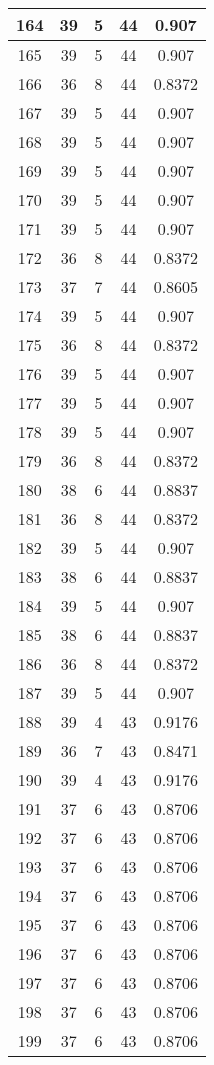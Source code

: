 \documentclass[letterpaper, 12pt]{article}
\begin{document}
\begin{longtable}{|c|c|c|c|c|}
164 & 39 & 5 & 44 & 0.907 \\
\hline
165 & 39 & 5 & 44 & 0.907 \\
\hline
166 & 36 & 8 & 44 & 0.8372 \\
\hline
167 & 39 & 5 & 44 & 0.907 \\
\hline
168 & 39 & 5 & 44 & 0.907 \\
\hline
169 & 39 & 5 & 44 & 0.907 \\
\hline
170 & 39 & 5 & 44 & 0.907 \\
\hline
171 & 39 & 5 & 44 & 0.907 \\
\hline
172 & 36 & 8 & 44 & 0.8372 \\
\hline
173 & 37 & 7 & 44 & 0.8605 \\
\hline
174 & 39 & 5 & 44 & 0.907 \\
\hline
175 & 36 & 8 & 44 & 0.8372 \\
\hline
176 & 39 & 5 & 44 & 0.907 \\
\hline
177 & 39 & 5 & 44 & 0.907 \\
\hline
178 & 39 & 5 & 44 & 0.907 \\
\hline
179 & 36 & 8 & 44 & 0.8372 \\
\hline
180 & 38 & 6 & 44 & 0.8837 \\
\hline
181 & 36 & 8 & 44 & 0.8372 \\
\hline
182 & 39 & 5 & 44 & 0.907 \\
\hline
183 & 38 & 6 & 44 & 0.8837 \\
\hline
184 & 39 & 5 & 44 & 0.907 \\
\hline
185 & 38 & 6 & 44 & 0.8837 \\
\hline
186 & 36 & 8 & 44 & 0.8372 \\
\hline
187 & 39 & 5 & 44 & 0.907 \\
\hline
188 & 39 & 4 & 43 & 0.9176 \\
\hline
189 & 36 & 7 & 43 & 0.8471 \\
\hline
190 & 39 & 4 & 43 & 0.9176 \\
\hline
191 & 37 & 6 & 43 & 0.8706 \\
\hline
192 & 37 & 6 & 43 & 0.8706 \\
\hline
193 & 37 & 6 & 43 & 0.8706 \\
\hline
194 & 37 & 6 & 43 & 0.8706 \\
\hline
195 & 37 & 6 & 43 & 0.8706 \\
\hline
196 & 37 & 6 & 43 & 0.8706 \\
\hline
197 & 37 & 6 & 43 & 0.8706 \\
\hline
198 & 37 & 6 & 43 & 0.8706 \\
\hline
199 & 37 & 6 & 43 & 0.8706 \\
\hline
\end{longtable}
\end{document}
